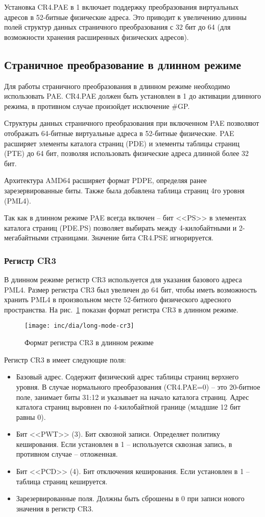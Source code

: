 Установка CR4.PAE в 1 включает поддержку преобразования виртуальных адресов в 52-битные физические адреса.
Это приводит к увеличению длинны полей структур данных страничного преобразования с 32 бит до 64 (для
возможности хранения расширенных физических адресов).


\subsection{Страничное преобразование в длинном режиме}
Для работы страничного преобразования в длинном режиме необходимо использовать PAE.
CR4.PAE должен быть установлен в 1 до активации длинного режима, в противном случае
произойдет исключение \#GP.

Структуры данных страничного преобразования при включенном PAE позволяют отображать 64-битные
виртуальные адреса в 52-битные физические. PAE расширяет элементы каталога страниц (PDE) и
элементы таблицы страниц (PTE) до 64 бит, позволяя использовать физические адреса длинной более 32 бит.

Архитектура AMD64 расширяет формат PDPE, определяя ранее зарезервированные биты.
Также была добавлена таблица страниц 4го уровня (PML4).

Так как в длинном режиме PAE всегда включен -- бит <<PS>> в элементах каталога страниц (PDE.PS)
позволяет выбирать между 4-килобайтными и 2-мегабайтными страницами. Значение бита CR4.PSE игнорируется.

\subsubsection*{Регистр CR3}
В длинном режиме регистр CR3 используется для указания базового адреса PML4. Размер регистра CR3 был
увеличен до 64 бит, чтобы иметь возможность хранить PML4 в произвольном месте 52-битного физического
адресного пространства. На рис.~\ref{fig:long-mode-cr3} показан формат регистра CR3 в длинном режиме.

\begin{figure}[ht!]
  \centering
  \texttt{[image: inc/dia/long-mode-cr3]}
  \caption{Формат регистра CR3 в длинном режиме}
  \label{fig:long-mode-cr3}
\end{figure}

Регистр CR3 в имеет следующие поля:
\begin{itemize}
\item Базовый адрес. Содержит физический адрес таблицы страниц верхнего уровня. В случае нормального
	преобразования (CR4.PAE=0) -- это 20-битное поле, занимает биты 31:12 и указывает на начало
	каталога страниц. Адрес каталога страниц выровнен по 4-килобайтной границе (младшие 12 бит равны 0).
\item Бит <<PWT>> (3). Бит сквозной записи. Определяет политику кеширования. Если установлен в 1 --
	используется сквозная запись, в противном случае -- отложенная.
\item Бит <<PCD>> (4). Бит отключения кеширования. Если установлен в 1 -- таблица страниц кешируется.
\item Зарезервированные поля. Должны быть сброшены в 0 при записи нового значения в регистр CR3.
\end{itemize}

